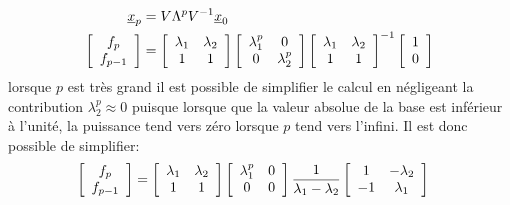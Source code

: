 \begin{example}
\begin{align}
\underline{x}_{p} &= V \Lambda^p V^{-1} \underline{x}_{0} \\
\left[ \begin{array}{c}  
f_p \\ f_{p-1}
\end{array} \right]
&= 
\left[ \begin{array}{c c }  
\lambda_1 & \lambda_2 \\
1         & 1 \\
\end{array} \right]
\left[ \begin{array}{c c }  
\lambda_1^p & 0 \\
0         & \lambda_2^p \\
\end{array} \right]
\left[ \begin{array}{c c }  
\lambda_1 & \lambda_2 \\
1         & 1 \\
\end{array} \right]^{-1} 
\left[ \begin{array}{c}  
1 \\ 0
\end{array} \right]
\end{align}
lorsque $p$ est très grand il est possible de simplifier le calcul en négligeant la contribution $\lambda_2^p \approx 0$ puisque lorsque que la valeur absolue de la base est inférieur à l'unité, la puissance tend vers zéro lorsque $p$ tend vers l'infini. Il est donc possible de simplifier:
\begin{align}
\left[ \begin{array}{c}  
f_p \\ f_{p-1}
\end{array} \right]
&= 
\left[ \begin{array}{c c }  
\lambda_1 & \lambda_2 \\
1         & 1 \\
\end{array} \right]
\left[ \begin{array}{c c }  
\lambda_1^p & 0 \\
0         & 0 \\
\end{array} \right]
\frac{1}{\lambda_1 - \lambda_2}
\left[ \begin{array}{c c }  
1 & -\lambda_2 \\
-1         & \lambda_1 \\
\end{array} \right] 

\end{align}
\end{example}
